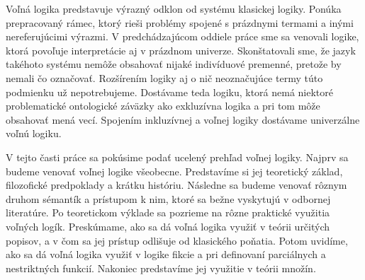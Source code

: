 \documentclass[12pt, letterpaper]{article}
\begin{document}
Voľná logika predstavuje výrazný odklon od systému klasickej logiky. Ponúka prepracovaný rámec, ktorý rieši problémy spojené s prázdnymi termami a inými nereferujúcimi výrazmi. V predchádzajúcom oddiele práce sme sa venovali logike, ktorá povoľuje interpretácie aj v prázdnom univerze. Skonštatovali sme, že jazyk takéhoto systému nemôže obsahovať nijaké indivíduové premenné, pretože by nemali čo označovať. Rozšírením logiky aj o nič neoznačujúce termy túto podmienku už nepotrebujeme. Dostávame teda logiku, ktorá nemá niektoré problematické ontologické záväzky ako exkluzívna logika a pri tom môže obsahovať mená vecí. Spojením inkluzívnej a voľnej logiky dostávame univerzálne voľnú logiku.\par
V tejto časti práce sa pokúsime podať ucelený prehľad voľnej logiky. Najprv sa budeme venovať voľnej logike všeobecne. Predstavíme si jej teoretický základ, filozofické predpoklady a krátku históriu. Následne sa budeme venovať rôznym druhom sémantík a prístupom k nim, ktoré sa bežne vyskytujú v odbornej literatúre. Po teoretickom výklade sa pozrieme na rôzne praktické využitia voľných logík. Preskúmame, ako sa dá voľná logika využiť v teórii určitých popisov, a v čom sa jej prístup odlišuje od klasického poňatia. Potom uvidíme, ako sa dá voľná logika využiť v logike fikcie a pri definovaní parciálnych a nestriktných funkcií. Nakoniec predstavíme jej využitie v teórii množín.
\end{document}
